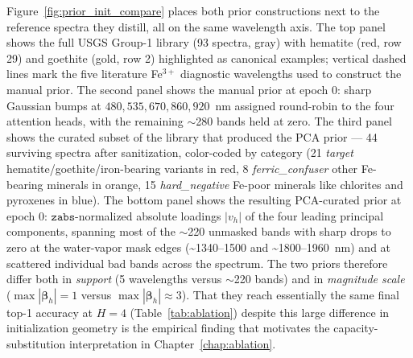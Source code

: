 \documentclass[11pt]{report}
\begin{document}
Figure~\ref{fig:prior_init_compare} places both prior constructions next to the reference spectra they distill, all on the same wavelength axis. The top panel shows the full USGS Group-1 library (93 spectra, gray) with hematite (red, row 29) and goethite (gold, row 2) highlighted as canonical examples; vertical dashed lines mark the five literature Fe$^{3+}$ diagnostic wavelengths used to construct the manual prior. The second panel shows the manual prior at epoch 0: sharp Gaussian bumps at $480, 535, 670, 860, 920$~nm assigned round-robin to the four attention heads, with the remaining $\sim$280 bands held at zero. The third panel shows the curated subset of the library that produced the PCA prior --- 44 surviving spectra after sanitization, color-coded by category (21 \emph{target} hematite/goethite/iron-bearing variants in red, 8 \emph{ferric\_confuser} other Fe-bearing minerals in orange, 15 \emph{hard\_negative} Fe-poor minerals like chlorites and pyroxenes in blue). The bottom panel shows the resulting PCA-curated prior at epoch 0: $\texttt{zabs}$-normalized absolute loadings $|v_h|$ of the four leading principal components, spanning most of the $\sim$220 unmasked bands with sharp drops to zero at the water-vapor mask edges (\textasciitilde{}1340--1500 and \textasciitilde{}1800--1960~nm) and at scattered individual bad bands across the spectrum.
The two priors therefore differ both in \emph{support} (5 wavelengths versus $\sim$220 bands) and in \emph{magnitude scale} ($\max |\bm{\beta}_h| = 1$ versus $\max |\bm{\beta}_h| \approx 3$). That they reach essentially the same final top-1 accuracy at $H = 4$ (Table~\ref{tab:ablation}) despite this large difference in initialization geometry is the empirical finding that motivates the capacity-substitution interpretation in Chapter~\ref{chap:ablation}.
\end{document}
